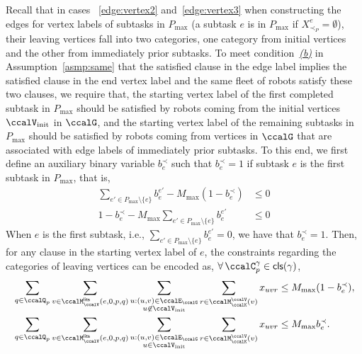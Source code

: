 \documentclass[Afour,sageh,times]{sagej}
\newcommand{\clause}[1]{\mathsf{cls}(#1)}
\begin{document}
{{{{{Recall that in cases ~\ref{edge:vertex2} and~\ref{edge:vertex3}  when constructing the edges for vertex labels of subtasks in $P_{\text{max}}$ (a subtask $e$ is in $P_{\text{max}}$ if $X_{\prec_P}^e=\emptyset$), their leaving vertices fall into two categories, one category from initial vertices and the other from immediately prior subtasks. To meet condition~\hyperref[asmp:b]{\it (b)}  in Assumption~\ref{asmp:same} that the satisfied clause in the edge label implies the satisfied clause in the end vertex label and the same fleet of robots satisfy these two clauses, we require that, the starting vertex label of the first completed  subtask in $P_{\text{max}}$ should be satisfied by robots coming from the initial vertices $\ccalV_{\text{init}}$ in $\ccalG$, and the starting vertex label of the remaining subtasks in $P_{\text{max}}$ should be satisfied by robots coming from vertices in $\ccalG$ that are associated with edge labels of immediately prior subtasks. To this end, we first define an auxiliary binary variable $b_{e}^{\prec}$ such that $b_{e}^{\prec}= 1$ if subtask $e$ is the first subtask in $P_{\text{max}}$, that is,
\begin{subequations}
  \begin{align}
   \sum_{e' \in P_{\text{max}}\setminus \{e\}} {b}_e^{e'}  - M_{\text{max}} (1 - b_{e}^{\prec}) & \leq 0\\
    1 - b_{e}^{\prec} -  M_{\text{max}}  \sum_{e' \in P_{\text{max}}\setminus \{e\}} {b}_e^{e'}    & \leq 0
  \end{align}
\end{subequations}
When $e$ is the first subtask, i.e., $ \sum_{e' \in P_{\text{max}}\setminus \{e\}} {b}_e^{e'}=0$, we have that $b_e^{\prec}=1$. Then, for any clause in the starting vertex label of $e$, the constraints regarding the categories of leaving vertices can be encoded as, $\forall \, \ccalC_p^\gamma \in \clause{\gamma} $,
\begin{subequations}\label{eq:routingforactivation}
  \begin{align}
   & \sum_{q\in \ccalQ_p} \sum_{v \in \ccalM^\mathsf{lits}_{\ccalV}(e,0,p,q)} \sum_{\substack{u: (u,v) \in \ccalE_\ccalG \\ u \not\in \ccalV_{\text{init}}}}   \sum_{r\in \ccalM^\ccalV_{\ccalK}(v)} x_{uvr} \leq M_{\text{max}} (1 - b_e^{\prec}),  \label{eq:routingforactivation_a}\\
   & \sum_{q\in \ccalQ_p} \sum_{v \in \ccalM^\mathsf{lits}_{\ccalV}(e,0,p,q)} \sum_{\substack{u: (u,v) \in \ccalE_\ccalG \\ u \in \ccalV_{\text{init}}}}   \sum_{r\in \ccalM^\ccalV_{\ccalK}(v)} x_{uvr} \leq M_{\text{max}}  b_e^{\prec}.  \label{eq:routingforactivation_b}

\end{align}
\end{subequations}}}}}}
\end{document}
